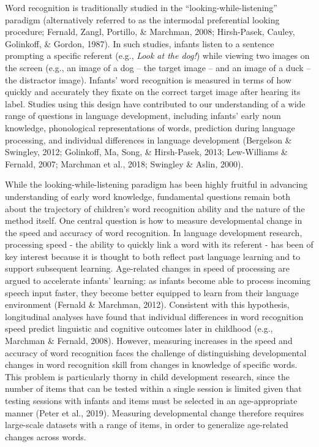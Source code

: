 \documentclass[10pt, letterpaper]{article}
\begin{document}
Word recognition is traditionally studied in the
``looking-while-listening'' paradigm (alternatively referred to as the
intermodal preferential looking procedure; Fernald, Zangl, Portillo, \&
Marchman, 2008; Hirsh-Pasek, Cauley, Golinkoff, \& Gordon, 1987). In
such studies, infants listen to a sentence prompting a specific referent
(e.g., \emph{Look at the dog!}) while viewing two images on the screen
(e.g., an image of a dog -- the target image -- and an image of a duck
-- the distractor image). Infants' word recognition is measured in terms
of how quickly and accurately they fixate on the correct target image
after hearing its label. Studies using this design have contributed to
our understanding of a wide range of questions in language development,
including infants' early noun knowledge, phonological representations of
words, prediction during language processing, and individual differences
in language development (Bergelson \& Swingley, 2012; Golinkoff, Ma,
Song, \& Hirsh-Pasek, 2013; Lew-Williams \& Fernald, 2007; Marchman et
al., 2018; Swingley \& Aslin, 2000).

While the looking-while-listening paradigm has been highly fruitful in
advancing understanding of early word knowledge, fundamental questions
remain both about the trajectory of children's word recognition ability
and the nature of the method itself. One central question is how to
measure developmental change in the speed and accuracy of word
recognition. In language development research, processing speed - the
ability to quickly link a word with its referent - has been of key
interest because it is thought to both reflect past language learning
and to support subsequent learning. Age-related changes in speed of
processing are argued to accelerate infants' learning: as infants become
able to process incoming speech input faster, they become better
equipped to learn from their language environment (Fernald \& Marchman,
2012). Consistent with this hypothesis, longitudinal analyses have found
that individual differences in word recognition speed predict linguistic
and cognitive outcomes later in childhood (e.g., Marchman \& Fernald,
2008). However, measuring increases in the speed and accuracy of word
recognition faces the challenge of distinguishing developmental changes
in word recognition skill from changes in knowledge of specific words.
This problem is particularly thorny in child development research, since
the number of items that can be tested within a single session is
limited given that testing sessions with infants and items must be
selected in an age-appropriate manner (Peter et al., 2019). Measuring
developmental change therefore requires large-scale datasets with a
range of items, in order to generalize age-related changes across words.
\end{document}
